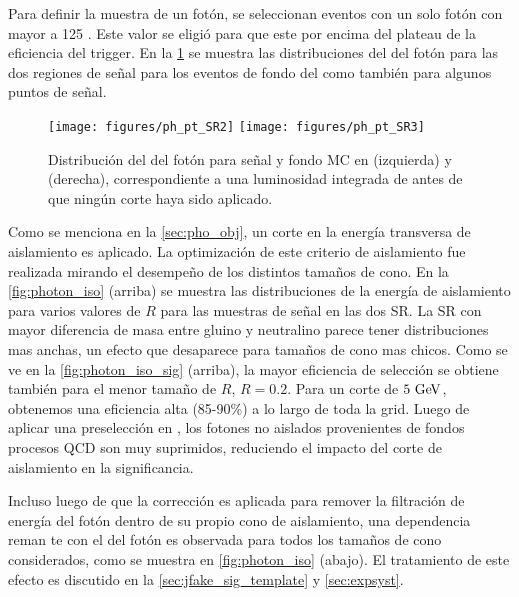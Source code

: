 Para definir la muestra de un fotón, se seleccionan eventos con un solo
fotón con {\pt} mayor a 125 \gev. Este valor se eligió para que este por
encima del plateau de la eficiencia del trigger. En la {\fig} \ref{fig:photon_pt}
se muestra las distribuciones del {\pt} del fotón para las dos regiones
de señal para los eventos de fondo del {\SM} como también para algunos puntos
de señal.

\begin{figure}[bh!]
  \centering
  \texttt{[image: figures/ph\_pt\_SR2]}
  \texttt{[image: figures/ph\_pt\_SR3]}
  \caption{Distribución del {\pt} del fotón para señal y fondo MC en {\SRL} (izquierda) y
    {\SRH} (derecha), correspondiente a una luminosidad integrada de {\ilumi} antes de que ningún
    corte haya sido aplicado. }
  \label{fig:photon_pt}
\end{figure}

Como se menciona en la {\Sec} \ref{sec:pho_obj}, un corte en la energía transversa
de aislamiento es aplicado.
La optimización de este criterio de aislamiento  fue realizada mirando el desempe\~no
de los distintos tamaños de cono. En la {\fig} \ref{fig:photon_iso} (arriba)
se muestra las distribuciones de la energía de aislamiento para varios valores de $R$ para
las muestras de señal en las dos SR. La SR con mayor diferencia de masa entre
gluino y neutralino parece tener distribuciones mas anchas, un efecto que desaparece
para tamaños de cono mas chicos. Como se ve en la  {\fig} \ref{fig:photon_iso_sig} (arriba),
la mayor eficiencia de selección se obtiene también para el menor tamaño de $R$, $R = 0.2$.
Para un corte de $5 \GeV$, obtenemos una eficiencia alta (85-90\%) a lo largo de toda la grid.
Luego de aplicar una preselección en {\met}, los fotones no aislados provenientes de fondos
procesos QCD son muy suprimidos, reduciendo el impacto del corte de aislamiento en la
significancia.

Incluso luego de que la corrección es aplicada para remover la filtración
de energía del fotón dentro de su propio cono de aislamiento, una dependencia
reman te con el {\pt} del fotón es observada para todos los tamaños de cono
considerados, como se muestra en {\fig} \ref{fig:photon_iso} (abajo).
El tratamiento de este efecto es discutido en la {\Sec} \ref{sec:jfake_sig_template}
y \ref{sec:expsyst}.

